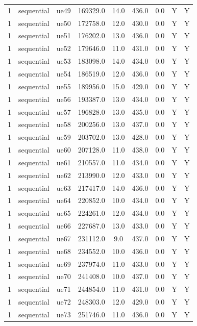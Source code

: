 \begin{table}[ht]
\begin{tabular}{|c|c|c|c|c|c|c|c|c|}
1 & sequential & ue49 & 169329.0 & 14.0 & 436.0 & 0.0 & Y & Y \\
1 & sequential & ue50 & 172758.0 & 12.0 & 430.0 & 0.0 & Y & Y \\
1 & sequential & ue51 & 176202.0 & 13.0 & 436.0 & 0.0 & Y & Y \\
1 & sequential & ue52 & 179646.0 & 11.0 & 431.0 & 0.0 & Y & Y \\
1 & sequential & ue53 & 183098.0 & 14.0 & 434.0 & 0.0 & Y & Y \\
1 & sequential & ue54 & 186519.0 & 12.0 & 436.0 & 0.0 & Y & Y \\
1 & sequential & ue55 & 189956.0 & 15.0 & 429.0 & 0.0 & Y & Y \\
1 & sequential & ue56 & 193387.0 & 13.0 & 434.0 & 0.0 & Y & Y \\
1 & sequential & ue57 & 196828.0 & 13.0 & 435.0 & 0.0 & Y & Y \\
1 & sequential & ue58 & 200256.0 & 13.0 & 437.0 & 0.0 & Y & Y \\
1 & sequential & ue59 & 203702.0 & 13.0 & 428.0 & 0.0 & Y & Y \\
1 & sequential & ue60 & 207128.0 & 11.0 & 438.0 & 0.0 & Y & Y \\
1 & sequential & ue61 & 210557.0 & 11.0 & 434.0 & 0.0 & Y & Y \\
1 & sequential & ue62 & 213990.0 & 12.0 & 433.0 & 0.0 & Y & Y \\
1 & sequential & ue63 & 217417.0 & 14.0 & 436.0 & 0.0 & Y & Y \\
1 & sequential & ue64 & 220852.0 & 10.0 & 434.0 & 0.0 & Y & Y \\
1 & sequential & ue65 & 224261.0 & 12.0 & 434.0 & 0.0 & Y & Y \\
1 & sequential & ue66 & 227687.0 & 13.0 & 433.0 & 0.0 & Y & Y \\
1 & sequential & ue67 & 231112.0 & 9.0 & 437.0 & 0.0 & Y & Y \\
1 & sequential & ue68 & 234552.0 & 10.0 & 436.0 & 0.0 & Y & Y \\
1 & sequential & ue69 & 237974.0 & 11.0 & 433.0 & 0.0 & Y & Y \\
1 & sequential & ue70 & 241408.0 & 10.0 & 437.0 & 0.0 & Y & Y \\
1 & sequential & ue71 & 244854.0 & 11.0 & 431.0 & 0.0 & Y & Y \\
1 & sequential & ue72 & 248303.0 & 12.0 & 429.0 & 0.0 & Y & Y \\
1 & sequential & ue73 & 251746.0 & 11.0 & 436.0 & 0.0 & Y & Y \\

\end{tabular}
\end{table}
